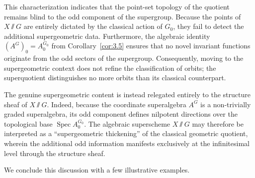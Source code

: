 \documentclass[11pt,a4paper,reqno,noamsfonts]{amsart}
\numberwithin{equation}{section}
\theoremstyle{definition}
\theoremstyle{remark}
\DeclareMathOperator{\Spec}{Spec}
\begin{document}
This characterization indicates that the point-set topology of the quotient remains blind to the odd component of the supergroup. Because the points of $X {\sslash} G$ are entirely dictated by the classical action of $G_{0}$, they fail to detect the additional supergeometric data. Furthermore, the algebraic identity $(A^G)_0=A_0^{G_0}$ from Corollary~\ref{cor:3.5} ensures that no novel invariant functions originate from the odd sectors of the supergroup. Consequently, moving to the supergeometric context does not refine the classification of orbits; the superquotient distinguishes no more orbits than its classical counterpart.

The genuine supergeometric content is instead relegated entirely to the structure sheaf of $X {\sslash} G$. Indeed, because the coordinate superalgebra $A^{G}$ is a non-trivially graded superalgebra, its odd component defines nilpotent directions over the topological base $\Spec A_0^{G_0}$. The algebraic superscheme $X {\sslash} G$ may therefore be interpreted as a ``supergeometric thickening'' of the classical geometric quotient, wherein the additional odd information manifests exclusively at the infinitesimal level through the structure sheaf.

We conclude this discussion with a few illustrative examples.
\end{document}
